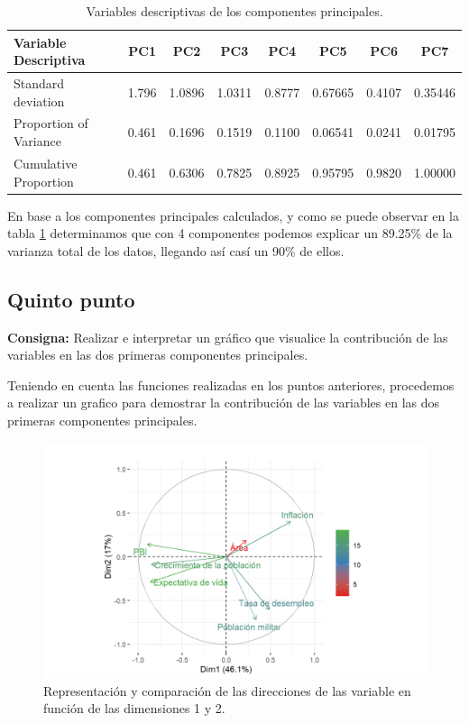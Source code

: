 \documentclass{article} %
\begin{document}
\begin{table}[H]
	\centering
		\begin{tabular}{||l || c | c | c | c | c | c | c ||}
			\hline
			\hline
			Variable Descriptiva & PC1 & PC2 & PC3 & PC4 & PC5 & PC6 & PC7\\
			\hline			
			\hline
			Standard deviation  &   1.796 &1.0896& 1.0311& 0.8777& 0.67665 &0.4107 &0.35446\\
			\hline
			Proportion of Variance &0.461 &0.1696 &0.1519 &0.1100 &0.06541 &0.0241& 0.01795\\
			\hline			
			Cumulative Proportion  &0.461 &0.6306 &0.7825 &0.8925 &0.95795 &0.9820 &1.00000\\
			\hline
			\hline
		\end{tabular}
		\caption{Variables descriptivas de los componentes principales.}
		\label{tab:table-punto-3-4}
\end{table}

En base a los componentes principales calculados, y como se puede observar en la tabla \ref{tab:table-punto-3-4} determinamos que con 4 componentes podemos explicar un 89.25\% de la varianza total de los datos, llegando así casí un 90\% de ellos.

\subsection{Quinto punto}

\textbf{Consigna:} Realizar e interpretar un gráfico que visualice la contribución de las variables en las dos primeras componentes principales.

Teniendo en cuenta las funciones realizadas en los puntos anteriores, procedemos a realizar un grafico para demostrar la contribución de las variables en las dos primeras componentes principales. 

\begin{figure}[H]
	\centering
	\includegraphics[width=1\textwidth]{images/3-5-1}
	\caption{Representación y comparación de las direcciones de las variable en función de las dimensiones 1 y 2.}
	\label{fig:falopa1}
\end{figure} 
\end{document}
